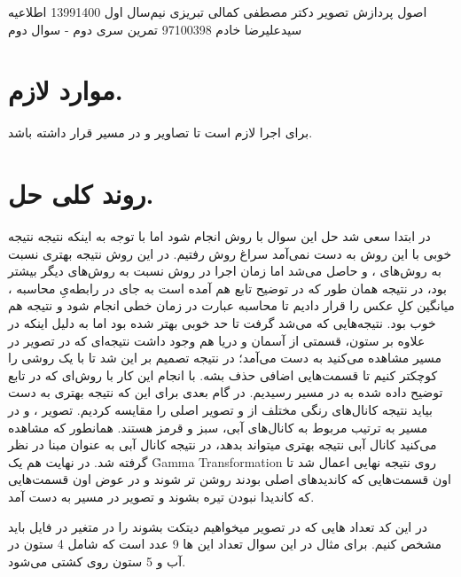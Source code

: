 \documentclass[a4paper,12pt]{article}
\begin{document}
\handout
{اصول پردازش تصویر}
{دکتر مصطفی کمالی تبریزی}
{نیم‌سال اول 1399\lr{-}1400}
{اطلاعیه}
{سیدعلیرضا خادم}
{97100398}
{تمرین سری دوم - سوال دوم}
\section*{موارد لازم.}
برای اجرا لازم است تا تصاویر
و
در مسیر
قرار داشته باشد.
\section*{روند کلی حل.}
در ابتدا سعی شد حل این سوال با روش 
انجام شود اما با توجه به اینکه نتیجه نتیجه خوبی با این روش به دست نمی‌آمد سراغ روش
 رفتیم. در این روش نتیجه بهتری نسبت به روش‌های
 ،
 و 
 حاصل می‌شد اما زمان اجرا در روش
 نسبت به روش‌های دیگر بیشتر بود، در نتیجه همان طور که در توضیح تابع هم
 آمده است  به جای 
  در رابطه‌یِ محاسبه 
  ،‌ میانگین کلِ عکس را قرار دادیم تا محاسبه عبارت در زمان خطی انجام شود و نتیجه هم خوب بود. نتیجه‌هایی که می‌شد گرفت تا حد خوبی بهتر شده بود اما به دلیل اینکه در 
  علاوه بر ستون، قسمتی از آسمان و دریا هم وجود داشت نتیجه‌ای که در تصویر 
  در مسیر
  مشاهده می‌کنید به دست می‌آمد؛ در نتیجه تصمیم بر این شد تا با یک روشی 
  را کوچکتر کنیم تا قسمت‌هایی اضافی حذف بشه. با انجام این کار با روش‌ای که در تابع 
   توضیح داده شده به 
    در مسیر
   رسیدیم. در گام بعدی برای این که نتیجه بهتری به دست بیاید نتیجه 
   کانال‌های رنگی مختلف از 
   و تصویر اصلی را مقایسه کردیم. تصویر
   ،
   و
    در مسیر
   به ترتیب مربوط به کانال‌های آبی، سبز و قرمز هستند. همانطور که مشاهده می‌کنید کانال آبی نتیجه بهتری میتواند بدهد، در نتیجه کانال آبی به عنوان مبنا در نظر گرفته شد. در نهایت هم یک
   \r{Gamma Transformation}
   روی نتیجه نهایی اعمال شد تا اون قسمت‌هایی که کاندید‌های اصلی بودند روشن تر شوند و در عوض اون قسمت‌هایی که کاندیدا نبودن تیره بشوند و تصویر 
   در مسیر
   به دست آمد.
  
  در این کد تعداد 
  هایی که در تصویر میخواهیم دیتکت بشوند را در متغیر 
  در فایل 
  باید مشخص کنیم. برای مثال در این سوال تعداد این 
  ها 9 عدد است که شامل 4 ستون در آب و 5 ستون روی کشتی می‌شود.
  
\end{document}
